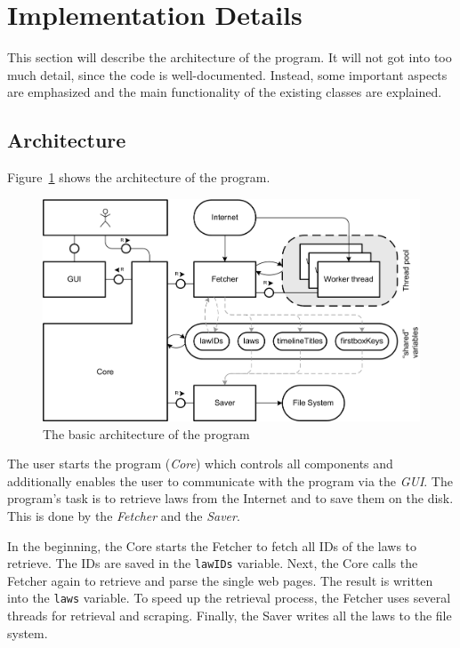 \documentclass{scrartcl}
\begin{document}
\section{Implementation Details}
This section will describe the architecture of the program. It will not got into too much detail, since the code is well-documented. Instead, some important aspects are emphasized and the main functionality of the existing classes are explained.

\subsection{Architecture}
Figure~\ref{Architecture} shows the architecture of the program.

\begin{figure}[ht]
\begin{center}
\includegraphics[width = \textwidth]{Architecture.png}
\caption{The basic architecture of the program}
\label{Architecture}
\end{center}
\end{figure}

The user starts the program (\textit{Core}) which controls all components and additionally enables the user to communicate with the program via the \textit{GUI}. The program's task is to retrieve laws from the Internet and to save them on the disk. This is done by the \textit{Fetcher} and the \textit{Saver}.

In the beginning, the Core starts the Fetcher to fetch all IDs of the laws to retrieve. The IDs are saved in the \texttt{lawIDs} variable. Next, the Core calls the Fetcher again to retrieve and parse the single web pages. The result is written into the \texttt{laws} variable. To speed up the retrieval process, the Fetcher uses several threads for retrieval and scraping. Finally, the Saver writes all the laws to the file system.
\end{document}
